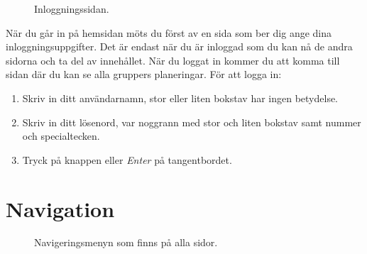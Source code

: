 \documentclass{article}
\newcommand{\button}[1]{{\tcbox{\textcolor{detail}{#1}}}}
\begin{document}
{\begin{figure}
        \caption{Inloggningssidan.}
        \label{fig:login}
    \end{figure}
    När du går in på hemsidan möts du först av en sida som ber dig ange dina inloggningsuppgifter. Det är endast när du är inloggad som du kan nå de andra sidorna och ta del av innehållet. När du loggat in kommer du att komma till sidan där du kan se alla gruppers planeringar. För att logga in:
    \begin{enumerate}
        \item Skriv in ditt användarnamn, stor eller liten bokstav har ingen betydelse.
        \item Skriv in ditt lösenord, var noggrann med stor och liten bokstav samt nummer och specialtecken.
        \item Tryck på knappen \button{Logga in} eller \textit{Enter} på tangentbordet.
    \end{enumerate}
    \vspace{40pt}

\section{Navigation}
    \begin{figure}
        \vspace{-15pt}
        \caption{Navigeringsmenyn som finns på alla sidor.}
        \label{fig:navbar}
    \end{figure}
    
}
\end{document}

